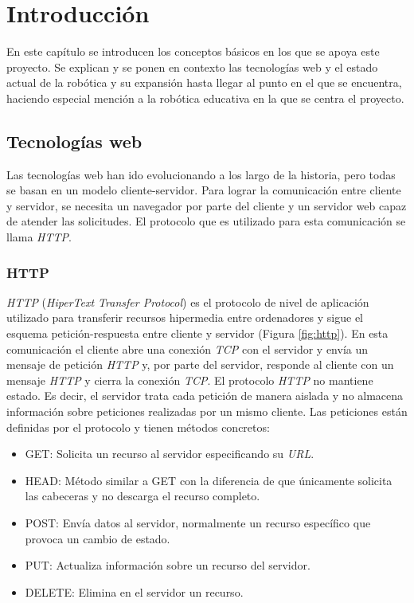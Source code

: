 
\chapter{Introducción}
\label{chap:intro} 
En este capítulo se introducen los conceptos básicos en los que se apoya este proyecto. Se explican y se ponen en contexto las tecnologías web y el estado actual de la robótica y su expansión hasta llegar al punto en el que se encuentra, haciendo especial mención a la robótica educativa en la que se centra el proyecto.
   
\section{Tecnologías web}
\label{sec:web}
Las tecnologías web han ido evolucionando a los largo de la historia, pero todas se basan en un modelo cliente-servidor. Para lograr la comunicación entre cliente y servidor, se necesita un navegador por parte del cliente y un servidor web capaz de atender las solicitudes. El protocolo que es utilizado para esta comunicación se llama \textit{HTTP}.

\subsection{HTTP}
\label{subsec:http}
\textit{HTTP} (\textit{HiperText Transfer Protocol}) es el protocolo de nivel de aplicación utilizado para transferir recursos hipermedia entre ordenadores y sigue el esquema petición-respuesta entre cliente y servidor (Figura \ref{fig:http}). En esta comunicación el cliente abre una conexión \textit{TCP} con el servidor y envía un mensaje de petición \textit{HTTP} y, por parte del servidor, responde al cliente con un mensaje \textit{HTTP} y cierra la conexión \textit{TCP}. 
El protocolo \textit{HTTP} no mantiene estado. Es decir, el servidor trata cada petición de manera aislada y no almacena información sobre peticiones realizadas por un mismo cliente. 
Las peticiones están definidas por el protocolo y tienen métodos concretos: 
\begin{itemize}
    \item GET: Solicita un recurso al servidor especificando su \textit{URL}.
    \item HEAD: Método similar a GET con la diferencia de que únicamente solicita las cabeceras y no descarga el recurso completo.
    \item POST: Envía datos al servidor, normalmente un recurso específico que provoca un cambio de estado. 
    \item PUT: Actualiza información sobre un recurso del servidor. 
    \item DELETE: Elimina en el servidor un recurso.
\end{itemize}

